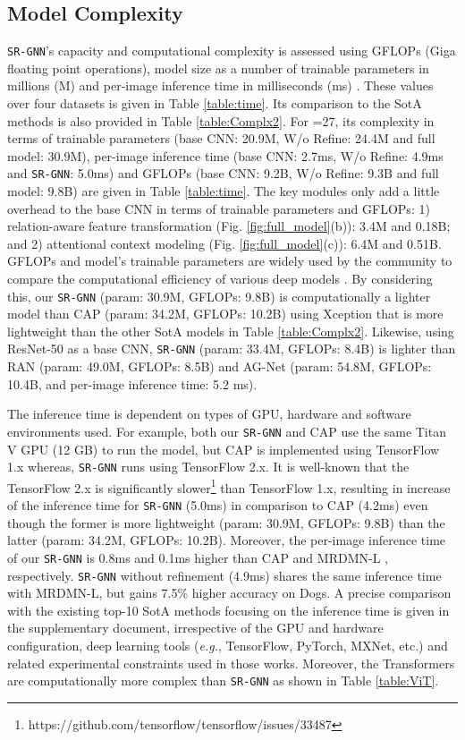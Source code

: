 \documentclass[journal]{IEEEtran}
\begin{document}
\vspace{ 0.3 cm}
\subsection {Model Complexity} 
\texttt{SR-GNN}'s capacity and computational complexity is assessed using  GFLOPs (Giga floating point operations), model size as a number of trainable parameters in millions (M) and per-image inference time in milliseconds (ms) \cite{tan2019efficientnet}. These values over four datasets is given in Table \ref{table:time}. Its comparison to the SotA methods is also provided in Table \ref{table:Complx2}. For =27, its complexity in terms of trainable parameters (base CNN: 20.9M, W/o Refine: 24.4M and full model: 30.9M), per-image inference time (base CNN: 2.7ms, W/o Refine: 4.9ms and \texttt{SR-GNN}: 5.0ms) and GFLOPs (base CNN: 9.2B, W/o Refine: 9.3B and full model: 9.8B) are given in Table \ref{table:time}. The key modules only add a little overhead to the base CNN in terms of trainable parameters and GFLOPs: 1) relation-aware feature transformation (Fig. \ref{fig:full_model}(b)): 3.4M and 0.18B; and 2) attentional context modeling (Fig. \ref{fig:full_model}(c)):  6.4M and 0.51B. GFLOPs and model’s trainable parameters are widely used by the community to compare the computational efficiency of various deep models \cite{tan2019efficientnet}. By considering this, our \texttt{SR-GNN} (param: 30.9M, GFLOPs: 9.8B) is computationally a lighter model than CAP (param: 34.2M, GFLOPs: 10.2B) using Xception that is more lightweight than the other SotA models in Table \ref{table:Complx2}. Likewise, using ResNet-50 as a base CNN,  \texttt{SR-GNN} (param: 33.4M, GFLOPs: 8.4B) is lighter than RAN (param: 49.0M, GFLOPs: 8.5B) and AG-Net (param: 54.8M, GFLOPs: 10.4B, and per-image inference time: 5.2 ms). 

 The inference time is dependent on types of GPU, hardware and software environments used. For example, both our \texttt{SR-GNN} and CAP \cite{behera2021context} use the same Titan V GPU (12 GB) to run the model, but CAP is implemented using TensorFlow 1.x whereas, \texttt{SR-GNN} runs using TensorFlow 2.x. It is well-known that the TensorFlow 2.x is significantly slower\footnote{https://github.com/tensorflow/tensorflow/issues/33487} than TensorFlow 1.x, resulting in increase of the inference time for \texttt{SR-GNN} (5.0ms) in comparison to CAP (4.2ms) even though the former is more lightweight (param: 30.9M, GFLOPs: 9.8B) than the latter (param: 34.2M, GFLOPs: 10.2B). Moreover, the per-image inference time of our \texttt{SR-GNN} is 0.8ms and 0.1ms higher than CAP and MRDMN-L \cite{xu2021multiresolution}, respectively. \texttt{SR-GNN} without refinement (4.9ms) shares the same inference time with MRDMN-L, but gains 7.5\%  higher accuracy on Dogs. A precise comparison with the existing top-10 SotA methods focusing on the inference time is given in the supplementary document, irrespective of the GPU and hardware configuration, deep learning tools (\textit{e.g.}, TensorFlow, PyTorch, MXNet, etc.) and related experimental constraints used in those works. Moreover, the Transformers are computationally more complex than \texttt{SR-GNN} as shown in Table \ref{table:ViT}.
\end{document}
